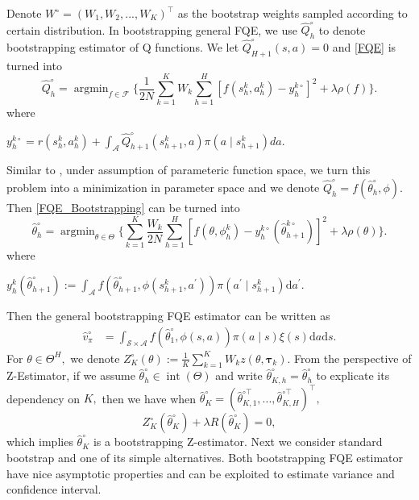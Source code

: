 \documentclass{article}
\numberwithin{equation}{section}
\newcommand{\pref}[1]{\prettyref{#1}}
\theoremstyle{plain}
\theoremstyle{definition}
\theoremstyle{remark}
\begin{document}
Denote $W^\circ = (W_1,W_2,...,W_K)^{\top}$ as the bootstrap weights sampled according to certain distribution. 
In bootstrapping general FQE, we use $\widehat{Q}_h^\circ$ to denote bootstrapping estimator of Q functions. We let $\widehat{Q}^\circ_{H+1} (s,a) = 0$ and \eqref{FQE} is turned into
\begin{equation}\label{FQE_Bootstrapping}
    \widehat{Q}_h^\circ = \mathop{\arg \min}_{f \in \mathcal{F}} \bigg\{\frac{1}{2N} \sum_{k=1}^K W_k \sum_{h=1}^H \left[f(s_h^k,a_h^k) - y_h^{k\circ}\right]^2 + \lambda \rho(f)\bigg\}.
\end{equation}
where \begin{footnotesize} $y_{h}^{k\circ} = r\left(s_{h}^k, a_{h}^k\right)+\int_{\mathcal{A}} \widehat{Q}_{h+1}^\circ\left(s_{h+1}^k, a\right) \pi\left(a \mid s_{h+1}^k\right) d a.$ \end{footnotesize} Similar to \pref{sec:fqe}, under assumption of parameteric function space, we turn this problem into a minimization in parameter space and we denote $\widehat{Q}_h^\circ = f(\widehat{\theta}_h^\circ,\phi).$ Then \eqref{FQE_Bootstrapping} can be turned into
\begin{equation}\label{definition_theta_h_circ}
    \widehat{\theta}_h^\circ = \mathop{\arg \min}_{\theta \in \Theta} \bigg\{\sum_{k=1}^K \frac{W_k}{2N} \sum_{h=1}^H \left[f\left(\theta,\phi_h^k\right) - y_h^{k\circ}\left(\widehat{\theta}_{h+1}^{k\circ}\right)\right]^2 + \lambda \rho(\theta)\bigg\}.
\end{equation}
where \begin{scriptsize} $y_h^{k}\left(\widehat{\theta}_{h+1}^{\circ}\right) := \int_{\mathcal{A}} f\left(\widehat{\theta}_{h+1}^{\circ}, \phi\left(s_{h+1}^k, a^{\prime}\right)\right) \pi\left(a^{\prime} \mid s_{h+1}^k\right) \mathrm{d} a^{\prime}.$ \end{scriptsize} Then the general bootstrapping FQE estimator can be written as
\begin{align}\label{bootstrapping_FQE}
    \widehat{v}_{\pi}^\circ &= \int_{\mathcal{S} \times \mathcal{A}} f(\widehat{\theta}_1^\circ,\phi(s,a)) \pi(a \mid s) \xi(s) \mathrm{d} a \mathrm{d} s.
\end{align}
For $\theta \in \Theta^H,$ we denote $Z_K^\circ(\theta) := \frac{1}{K} \sum_{k=1}^K W_k z\left(\theta,\boldsymbol{\tau}_k\right).$ From the perspective of Z-Estimator, if we assume $\widehat{\theta}_h^\circ \in \operatorname{int}(\Theta)$ and write $\widehat{\theta}^\circ_{K,h} = \widehat{\theta}^\circ_{h}$ to explicate its dependency on $K,$ then we have when $\widehat{\theta}_K^\circ = (\widehat{\theta}_{K,1}^{\circ \top},...,\widehat{\theta}_{K,H}^{\circ \top})^{\top},$
\begin{equation*}
    Z_K^\circ \left(\widehat{\theta}_K^\circ\right) + \lambda R(\widehat{\theta}_K^\circ) = 0,
\end{equation*}
which implies $\widehat{\theta}_K^\circ$ is a bootstrapping Z-estimator. Next we consider standard bootstrap and one of its simple alternatives. Both bootstrapping FQE estimator have nice asymptotic properties and can be exploited to estimate variance and confidence interval.
\end{document}
